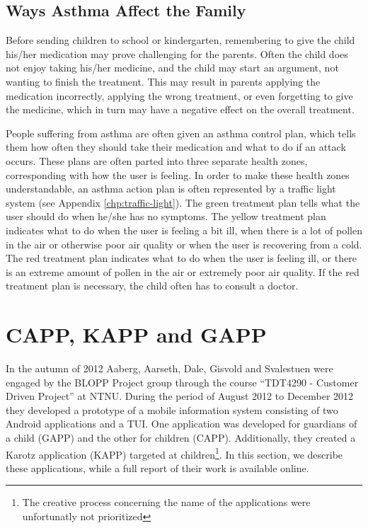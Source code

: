 \subsection{Ways Asthma Affect the Family}
\label{sec:waysasthmaaffectthefamily}
Before sending children to school or kindergarten, remembering to give the child his/her medication may prove challenging for the parents. Often the child does not enjoy taking his/her medicine, and the child may start an argument, not wanting to finish the treatment. This may result in parents applying the medication incorrectly, applying the wrong treatment, or even forgetting to give the medicine, which in turn may have a negative effect on the overall treatment.  

People suffering from asthma are often given an asthma control plan, which tells them how often they should take their medication and what to do if an attack occurs. These plans are often parted into three separate health zones, corresponding with how the user is feeling. In order to make these health zones understandable, an asthma action plan is often represented by a traffic light system (see Appendix \ref{chp:traffic-light}). The green treatment plan tells what the user should do when he/she has no symptoms. The yellow treatment plan indicates what to do when the user is feeling a bit ill, when there is a lot of pollen in the air or otherwise poor air quality or when the user is recovering from a cold. The red treatment plan indicates what to do when the user is feeling ill, or there is an extreme amount of pollen in the air or extremely poor air quality. If the red treatment plan is necessary, the child often has to consult a doctor. 

\clearpage{}

\section{CAPP, KAPP and GAPP}
\label{sec:cappgappkapp}
In the autumn of 2012 Aaberg, Aarseth, Dale, Gisvold and Svalestuen were engaged by the BLOPP Project group through the course ``TDT4290 - Customer Driven Project'' at NTNU. During the period of August 2012 to December 2012 they developed a prototype of a mobile information system consisting of two Android applications and a TUI. One application was developed for guardians of a child (GAPP) and the other for children (CAPP). Additionally, they created a Karotz application (KAPP) targeted at children\footnote{The creative process concerning the name of the applications were unfortunatly not prioritized}. In this section, we describe these applications, while a full report of their work is available online\cite{CustomerDriven}. 

